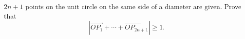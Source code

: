 $2n + 1$ points on the unit circle on the same side of a diameter are given. Prove that
\[ |\overrightarrow{OP_1} + \cdots + \overrightarrow{OP_{2n+1}}| \geq 1. \]

